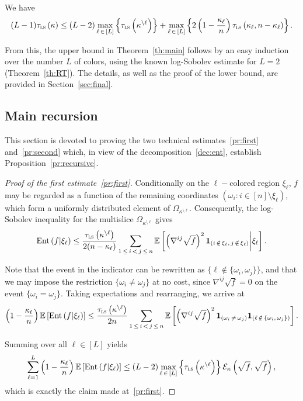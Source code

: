 \documentclass[10pt]{amsart}
\theoremstyle{definition}\newtheorem{defi}[theo]{Definition}\newtheorem{rema}[theo]{Remark}\newtheorem{exam}[theo]{Example}\newtheorem{exem}[theo]{Example}\newtheorem{nota}[theo]{Notation}
\newcommand{\EE}{\mathbb{E}}
\newcommand{\cE}{\mathcal{E}}
\newcommand{\tls}{\tau_{\textsc{ls}}}
\newcommand{\bfun}{\bf 1}
\DeclareMathOperator{\ent}{Ent}
\begin{document}
\begin{prop}\label{pr:recursive}
We have
\[
(L-1)\tls\left(\kappa\right) \le (L-2)\max_{\ell\,\in\,[L]}\left\{\tls\left(\kappa^{\setminus \ell}\right)\right\}+\max_{\ell\,\in\,[L]}\left\{2\left(1-\frac{\kappa_\ell}n\right)\tls\left(\kappa_\ell,n-\kappa_\ell\right)\right\}.
\]
\end{prop}

From this, the upper bound in Theorem~\ref{th:main} follows by an easy induction over the number $L$ of colors, using the known log-Sobolev estimate for $L=2$ (Theorem~\ref{th:RT}). The details, as well as the proof of the lower bound, are provided in Section~\ref{sec:final}.

\subsection{Main recursion}
This section is devoted to proving the two technical estimates~\eqref{pr:first} and~\eqref{pr:second} which, in view of the decomposition~\eqref{dec:ent}, establish Proposition~\ref{pr:recursive}.


\begin{proof}[Proof of the first estimate~\eqref{pr:first}]
Conditionally on the $\ell-$colored region $\xi_\ell$, $f$ may be regarded as a function of the remaining coordinates $(\omega_i\colon i\in[n]\setminus \xi_\ell)$, which form a uniformly distributed element of $\Omega_{\kappa^{\setminus\ell}}$. Consequently, the log-Sobolev inequality for the multislice $\Omega_{\kappa^{\setminus\ell}}$ gives
\[
\ent\left(f|\xi_\ell\right) \le \frac{\tls\left(\kappa^{\setminus\ell}\right)}{2(n-\kappa_\ell)}\sum_{1\,\le\,i\,<\,j\,\le\,n}\EE\left[\left(\nabla^{ij}\sqrt{f}\right)^2{\bfun}_{(i\,\notin\,\xi_\ell,\,j\,\notin\,\xi_\ell)}\middle|\xi_\ell\right].
\]

Note that the event in the indicator can be rewritten as $\{\ell\notin\{\omega_i,\omega_j\}\}$, and that we may impose the restriction $\{\omega_i\ne\omega_j\}$ at no cost, since $\nabla^{ij}\sqrt{f}=0$ on the event $\{\omega_i=\omega_j\}$. Taking expectations and rearranging, we arrive at
\[
\left(1-\frac{\kappa_\ell}{n}\right)\EE\left[\ent\left(f|\xi_\ell\right)\right] \le \frac{\tls\left(\kappa^{\setminus\ell}\right)}{2n}\sum_{1\,\le\,i\,<\,j\,\le\,n}\EE\left[\left(\nabla^{ij}\sqrt{f}\right)^2{\bfun}_{\left(\omega_i\,\ne\,\omega_j\right)}{\bfun}_{\left(\ell\,\notin\,\left\{\omega_i,\,\omega_j\right\}\right)}\right].
\]

Summing over all $\ell\in[L]$ yields
\[
\sum_{\ell=1}^L\left(1-\frac{\kappa_\ell}{n}\right)\EE\left[\ent\left(f|\xi_\ell\right)\right] \le (L-2)\max_{\ell\,\in\,[L]}\left\{\tls\left(\kappa^{\setminus\ell}\right)\right\}\cE_\kappa\left(\sqrt{f},\sqrt{f}\right),
\]
which is exactly the claim made at~\eqref{pr:first}.
\end{proof}
\end{document}
